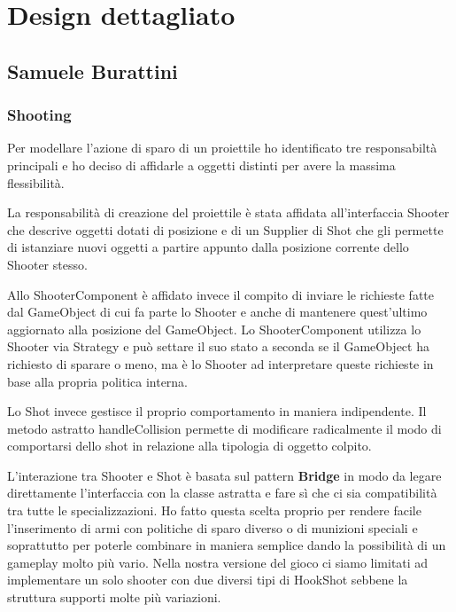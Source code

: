 \documentclass[a4paper,12pt]{report}
\begin{document}
\section{Design dettagliato}

\subsection*{Samuele Burattini}

\subsubsection*{Shooting}

Per modellare l'azione di sparo di un proiettile ho identificato tre responsabiltà principali e ho deciso di affidarle a oggetti distinti per avere la massima flessibilità.

La responsabilità di creazione del proiettile è stata affidata all'interfaccia Shooter che descrive oggetti dotati di posizione e di un Supplier di Shot che gli permette di istanziare nuovi oggetti a partire appunto dalla posizione corrente dello Shooter stesso.

Allo ShooterComponent è affidato invece il compito di inviare le richieste fatte dal GameObject di cui fa parte lo Shooter e anche di mantenere quest'ultimo aggiornato alla posizione del GameObject.
Lo ShooterComponent utilizza lo Shooter via Strategy e può settare il suo stato a seconda se il GameObject ha richiesto di sparare o meno, ma è lo Shooter ad interpretare queste richieste in base alla propria politica interna.

Lo Shot invece gestisce il proprio comportamento in maniera indipendente.
Il metodo astratto handleCollision permette di modificare radicalmente il modo di comportarsi dello shot in relazione alla tipologia di oggetto colpito.

L'interazione tra Shooter e Shot è basata sul pattern \textbf{Bridge} in modo da legare direttamente l'interfaccia con la classe astratta e fare sì che ci sia compatibilità tra tutte le specializzazioni.
Ho fatto questa scelta proprio per rendere facile l'inserimento di armi con politiche di sparo diverso o di munizioni speciali e soprattutto per poterle combinare in maniera semplice dando la possibilità di un gameplay molto più vario.
Nella nostra versione del gioco ci siamo limitati ad implementare un solo shooter con due diversi tipi di HookShot sebbene la struttura supporti molte più variazioni.
\end{document}
